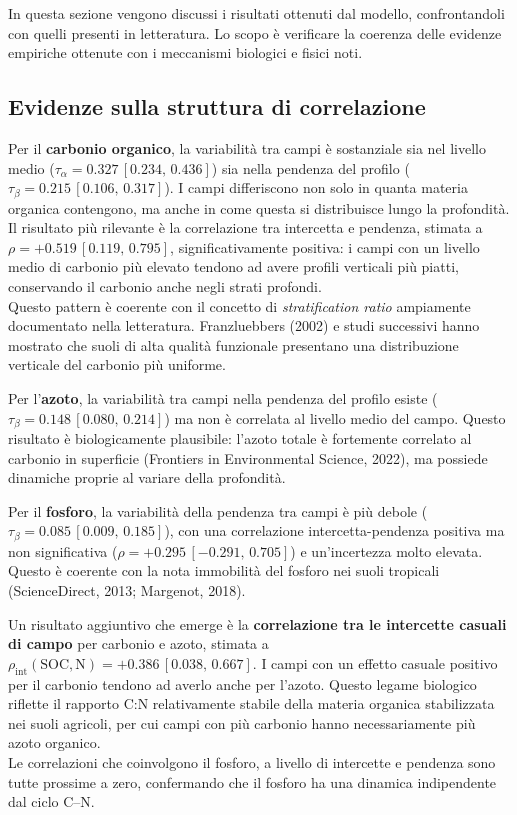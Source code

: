 \documentclass[11pt, a4paper]{article}
\begin{document}
In questa sezione vengono discussi i risultati ottenuti dal modello, confrontandoli con quelli presenti in letteratura. Lo scopo è verificare la coerenza delle evidenze empiriche ottenute con i meccanismi biologici e fisici noti.

\subsection{Evidenze sulla struttura di correlazione}

Per il \textbf{carbonio organico}, la variabilità tra campi è sostanziale sia nel livello medio ($\tau_\alpha = 0.327\,[0.234,\,0.436]$) sia nella pendenza del profilo ($\tau_\beta = 0.215\,[0.106,\,0.317]$). I campi differiscono non solo in quanta materia organica contengono, ma anche in come questa si distribuisce lungo la profondità. 
Il risultato più rilevante è la correlazione tra intercetta e pendenza, stimata a $\rho = +0.519\,[0.119,\,0.795]$, significativamente positiva: i campi con un livello medio di carbonio più elevato tendono ad avere profili verticali più piatti, conservando il carbonio anche negli strati profondi. 
\\ Questo pattern è coerente con il concetto di \emph{stratification ratio} ampiamente documentato nella letteratura. Franzluebbers (2002) e studi successivi hanno mostrato che suoli di alta qualità funzionale presentano una distribuzione verticale del carbonio più uniforme.

Per l'\textbf{azoto}, la variabilità tra campi nella pendenza del profilo esiste ($\tau_\beta = 0.148\,[0.080,\,0.214]$) ma non è correlata al livello medio del campo. Questo risultato è biologicamente plausibile: l'azoto totale è fortemente correlato al carbonio in superficie (Frontiers in Environmental Science, 2022), ma possiede dinamiche proprie al variare della profondità.

Per il \textbf{fosforo}, la variabilità della pendenza tra campi è più debole ($\tau_\beta = 0.085\,[0.009,\,0.185]$), con una correlazione intercetta-pendenza positiva ma non significativa ($\rho = +0.295\,[ -0.291,\,0.705]$) e un'incertezza molto elevata. Questo è coerente con la nota immobilità del fosforo nei suoli tropicali (ScienceDirect, 2013; Margenot, 2018).

Un risultato aggiuntivo che emerge è la \textbf{correlazione tra le intercette casuali di campo} per carbonio e azoto, stimata a $\rho_{\text{int}}(\text{SOC},\text{N}) = +0.386\,[0.038,\,0.667]$. I campi con un effetto casuale positivo per il carbonio tendono ad averlo anche per l'azoto. Questo legame biologico riflette il rapporto C:N relativamente stabile della materia organica stabilizzata nei suoli agricoli, per cui campi con più carbonio hanno necessariamente più azoto organico.
\\  Le correlazioni che coinvolgono il fosforo, a livello di intercette e pendenza sono tutte prossime a zero, confermando che il fosforo ha una dinamica indipendente dal ciclo C--N.
\end{document}
